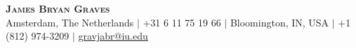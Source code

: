 \begin{center}
    \textbf{\Huge \scshape James Bryan Graves} \\ \vspace{1pt}
    \small Amsterdam, The Netherlands $|$ +31 6 11 75 19 66 $|$ Bloomington, IN, USA $|$ +1 (812) 974-3209 $|$ \href{mailto:gravjabr@iu.edu}{\underline{gravjabr@iu.edu}}
\end{center}